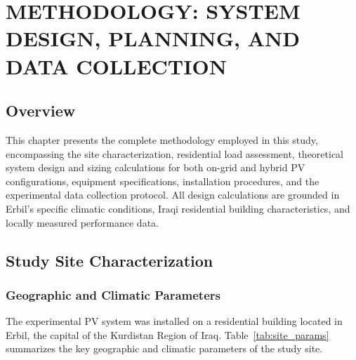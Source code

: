 
\chapter{METHODOLOGY: SYSTEM DESIGN, PLANNING, AND DATA COLLECTION}

\section{Overview}

This chapter presents the complete methodology employed in this study, encompassing the site characterization, residential load assessment, theoretical system design and sizing calculations for both on-grid and hybrid PV configurations, equipment specifications, installation procedures, and the experimental data collection protocol. All design calculations are grounded in Erbil's specific climatic conditions, Iraqi residential building characteristics, and locally measured performance data.


\section{Study Site Characterization}

\subsection{Geographic and Climatic Parameters}

The experimental PV system was installed on a residential building located in Erbil, the capital of the Kurdistan Region of Iraq. Table~\ref{tab:site_params} summarizes the key geographic and climatic parameters of the study site.

